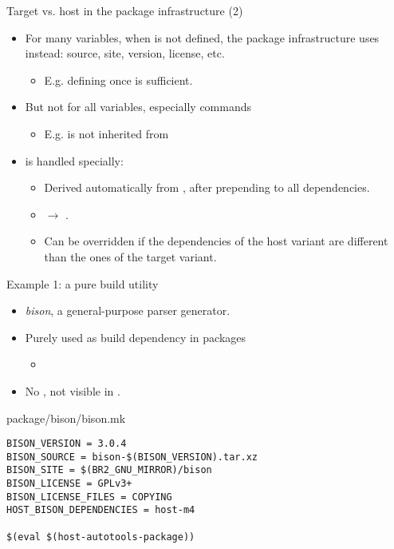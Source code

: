 \begin{frame}{Target vs. host in the package infrastructure (2)}
  \begin{itemize}
  \item For many variables, when  is not defined,
    the package infrastructure uses  instead: source,
    site, version, license, etc.
    \begin{itemize}
    \item E.g. defining  once is sufficient.
    \end{itemize}
  \item But not for all variables, especially commands
    \begin{itemize}
    \item E.g.  is not inherited
      from 
    \end{itemize}
  \item {} is handled specially:
    \begin{itemize}
    \item Derived automatically from , after
      prepending  to all dependencies.
    \item {} $\rightarrow$
      .
    \item Can be overridden if the dependencies of the host variant are
      different than the ones of the target variant.
    \end{itemize}
  \end{itemize}
\end{frame}

\begin{frame}[fragile]{Example 1: a pure build utility}
  \begin{itemize}
  \item {\em bison}, a general-purpose parser generator.
  \item Purely used as build dependency in packages
    \begin{itemize}
    \item {}
    \end{itemize}
  \item No , not visible in .
  \end{itemize}
  \begin{block}{package/bison/bison.mk}
    \begin{verbatim}
BISON_VERSION = 3.0.4
BISON_SOURCE = bison-$(BISON_VERSION).tar.xz
BISON_SITE = $(BR2_GNU_MIRROR)/bison
BISON_LICENSE = GPLv3+
BISON_LICENSE_FILES = COPYING
HOST_BISON_DEPENDENCIES = host-m4

$(eval $(host-autotools-package))
    \end{verbatim}
  \end{block}
\end{frame}

